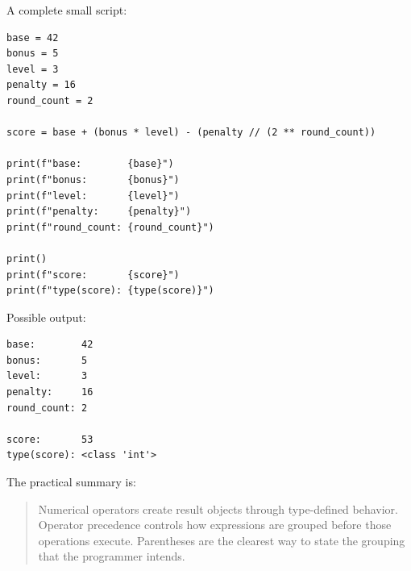 A complete small script:

\begin{verbatim}
base = 42
bonus = 5
level = 3
penalty = 16
round_count = 2

score = base + (bonus * level) - (penalty // (2 ** round_count))

print(f"base:        {base}")
print(f"bonus:       {bonus}")
print(f"level:       {level}")
print(f"penalty:     {penalty}")
print(f"round_count: {round_count}")

print()
print(f"score:       {score}")
print(f"type(score): {type(score)}")
\end{verbatim}

Possible output:

\begin{verbatim}
base:        42
bonus:       5
level:       3
penalty:     16
round_count: 2

score:       53
type(score): <class 'int'>
\end{verbatim}

The practical summary is:

\begin{quote}
Numerical operators create result objects through type-defined behavior. Operator precedence controls how expressions are grouped before those operations execute. Parentheses are the clearest way to state the grouping that the programmer intends.
\end{quote}